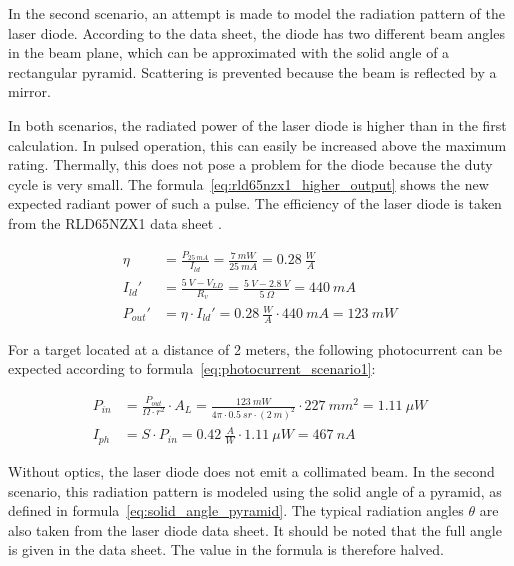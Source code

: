 In the second scenario, an attempt is made to model the radiation pattern of the laser diode. According to the data sheet, the
diode has two different beam angles in the beam plane, which can be approximated with the solid angle of a rectangular pyramid.
Scattering is prevented because the beam is reflected by a mirror.

In both scenarios, the radiated power of the laser diode is higher than in the first calculation. In pulsed
operation, this can easily be increased above the maximum rating. Thermally, this does not pose a problem for the diode because
the duty cycle is very small. The formula~\ref{eq:rld65nzx1_higher_output} shows the new expected radiant power
of such a pulse. The efficiency of the laser diode is taken from the RLD65NZX1 data sheet \cite{rohm2019rld65nzx1_datasheet}.

\begin{equation}\label{eq:rld65nzx1_higher_output}
    \begin{split}
        \eta     & = \frac{P_{25~mA}}{I_{ld}} = \frac{7~mW}{25~mA} = 0.28~\frac{W}{A}   \\
        I_{ld}'  & = \frac{5~V - V_{LD}}{R_{v}} = \frac{5~V - 2.8~V}{5~\Omega} = 440~mA \\
        P_{out}' & = \eta \cdot I_{ld}' = 0.28~\frac{W}{A} \cdot 440~mA = 123~mW
    \end{split}
\end{equation}

For a target located at a distance of 2 meters, the following
photocurrent can be expected according to formula~\ref{eq:photocurrent_scenario1}:

\begin{equation}\label{eq:photocurrent_scenario1}
    \begin{split}
        P_{in} & = \frac{P_{out}}{\Omega \cdot r^2} \cdot A_{L} = \frac{123~mW}{4\pi \cdot 0.5~sr \cdot (2~m)^2} \cdot 227~mm^2 = 1.11~\mu W \\
        I_{ph} & = S \cdot P_{in} = 0.42~\frac{A}{W} \cdot 1.11~\mu W = 467~nA
    \end{split}
\end{equation}

Without optics, the laser diode does not emit a collimated beam. In the second scenario, this radiation pattern is modeled using
the solid angle of a pyramid, as defined in formula~\ref{eq:solid_angle_pyramid}. The typical
radiation angles $\theta$ are also taken from the laser diode data sheet. It should be noted that the
full angle is given in the data sheet. The value in the formula is therefore halved.

